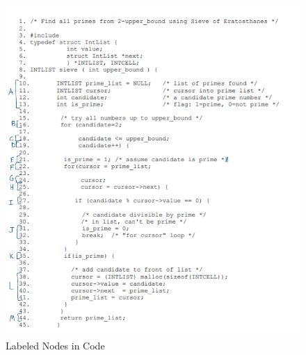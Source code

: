 \documentclass[11pt]{article}
\begin{document}

\begin{figure}[H]
    \centering
    \includegraphics[scale = 0.5]{./q2.png}
    \caption{Labeled Nodes in Code}
    \label{fig:nodes}
\end{figure}
\end{document}

